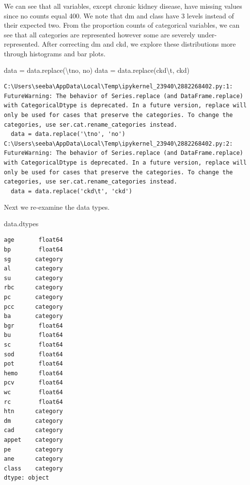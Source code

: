 \documentclass[
  11pt,
  letterpaper,
  DIV=11,
  numbers=noendperiod]{scrartcl}
\newenvironment{Shaded}{\begin{snugshade}}{\end{snugshade}}
\newcommand{\CharTok}[1]{\textcolor[rgb]{0.13,0.47,0.30}{#1}}
\newcommand{\NormalTok}[1]{\textcolor[rgb]{0.00,0.23,0.31}{#1}}
\newcommand{\OperatorTok}[1]{\textcolor[rgb]{0.37,0.37,0.37}{#1}}
\newcommand{\StringTok}[1]{\textcolor[rgb]{0.13,0.47,0.30}{#1}}
\begin{document}
We can see that all variables, except chronic kidney disease, have
missing values since no counts equal 400. We note that dm and class have
3 levels instead of their expected two. From the proportion counts of
categorical variables, we can see that all categories are represented
however some are severely under-represented. After correcting dm and
ckd, we explore these distributions more through histograms and bar
plots.

\begin{Shaded}
\begin{Highlighting}[]
\NormalTok{data }\OperatorTok{=}\NormalTok{ data.replace(}\StringTok{\textquotesingle{}}\CharTok{\textbackslash{}t}\StringTok{no\textquotesingle{}}\NormalTok{, }\StringTok{\textquotesingle{}no\textquotesingle{}}\NormalTok{)}
\NormalTok{data }\OperatorTok{=}\NormalTok{ data.replace(}\StringTok{\textquotesingle{}ckd}\CharTok{\textbackslash{}t}\StringTok{\textquotesingle{}}\NormalTok{, }\StringTok{\textquotesingle{}ckd\textquotesingle{}}\NormalTok{)}
\end{Highlighting}
\end{Shaded}

\begin{verbatim}
C:\Users\seeba\AppData\Local\Temp\ipykernel_23940\2882268402.py:1: FutureWarning: The behavior of Series.replace (and DataFrame.replace) with CategoricalDtype is deprecated. In a future version, replace will only be used for cases that preserve the categories. To change the categories, use ser.cat.rename_categories instead.
  data = data.replace('\tno', 'no')
C:\Users\seeba\AppData\Local\Temp\ipykernel_23940\2882268402.py:2: FutureWarning: The behavior of Series.replace (and DataFrame.replace) with CategoricalDtype is deprecated. In a future version, replace will only be used for cases that preserve the categories. To change the categories, use ser.cat.rename_categories instead.
  data = data.replace('ckd\t', 'ckd')
\end{verbatim}

Next we re-examine the data types.

\begin{Shaded}
\begin{Highlighting}[]
\NormalTok{data.dtypes}
\end{Highlighting}
\end{Shaded}

\begin{verbatim}
age       float64
bp        float64
sg       category
al       category
su       category
rbc      category
pc       category
pcc      category
ba       category
bgr       float64
bu        float64
sc        float64
sod       float64
pot       float64
hemo      float64
pcv       float64
wc        float64
rc        float64
htn      category
dm       category
cad      category
appet    category
pe       category
ane      category
class    category
dtype: object
\end{verbatim}
\end{document}
